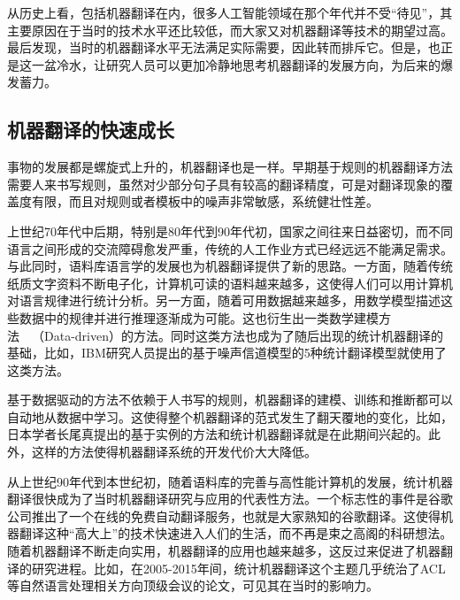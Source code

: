 \parinterval 从历史上看，包括机器翻译在内，很多人工智能领域在那个年代并不受“待见”，其主要原因在于当时的技术水平还比较低，而大家又对机器翻译等技术的期望过高。最后发现，当时的机器翻译水平无法满足实际需要，因此转而排斥它。但是，也正是这一盆冷水，让研究人员可以更加冷静地思考机器翻译的发展方向，为后来的爆发蓄力。


\subsection{机器翻译的快速成长}

\parinterval 事物的发展都是螺旋式上升的，机器翻译也是一样。早期基于规则的机器翻译方法需要人来书写规则，虽然对少部分句子具有较高的翻译精度，可是对翻译现象的覆盖度有限，而且对规则或者模板中的噪声非常敏感，系统健壮性差。

\parinterval 上世纪70年代中后期，特别是80年代到90年代初，国家之间往来日益密切，而不同语言之间形成的交流障碍愈发严重，传统的人工作业方式已经远远不能满足需求。与此同时，语料库语言学的发展也为机器翻译提供了新的思路。一方面，随着传统纸质文字资料不断电子化，计算机可读的语料越来越多，这使得人们可以用计算机对语言规律进行统计分析。另一方面，随着可用数据越来越多，用数学模型描述这些数据中的规律并进行推理逐渐成为可能。这也衍生出一类数学建模方法\ \dash\ {\small{}}（Data-driven）的方法。同时这类方法也成为了随后出现的统计机器翻译的基础，比如，IBM研究人员提出的基于噪声信道模型的5种统计翻译模型就使用了这类方法。

\parinterval 基于数据驱动的方法不依赖于人书写的规则，机器翻译的建模、训练和推断都可以自动地从数据中学习。这使得整个机器翻译的范式发生了翻天覆地的变化，比如，日本学者长尾真提出的基于实例的方法和统计机器翻译就是在此期间兴起的。此外，这样的方法使得机器翻译系统的开发代价大大降低。

\parinterval 从上世纪90年代到本世纪初，随着语料库的完善与高性能计算机的发展，统计机器翻译很快成为了当时机器翻译研究与应用的代表性方法。一个标志性的事件是谷歌公司推出了一个在线的免费自动翻译服务，也就是大家熟知的谷歌翻译。这使得机器翻译这种“高大上”的技术快速进入人们的生活，而不再是束之高阁的科研想法。随着机器翻译不断走向实用，机器翻译的应用也越来越多，这反过来促进了机器翻译的研究进程。比如，在2005-2015年间，统计机器翻译这个主题几乎统治了ACL等自然语言处理相关方向顶级会议的论文，可见其在当时的影响力。

